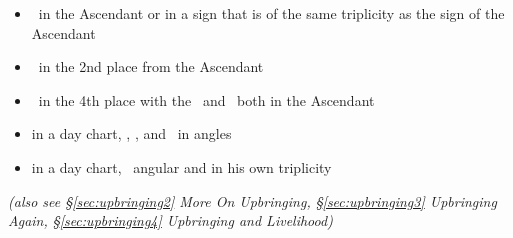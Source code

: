 \begin{itemize}[topsep=0pt,itemsep=0pt]
\item \Jupiter\, in the Ascendant or in a sign that is of the same triplicity as the sign of the Ascendant 

\item \Jupiter\, in the 2nd place from the Ascendant

\item \Jupiter\, in the 4th place with the \Moon\, and \Mercury\, both in the Ascendant

\item in a day chart, \Saturn, \Jupiter, and \Mercury\, in angles

\item in a day chart, \Saturn\, angular and in his own triplicity
\end{itemize}

\textsl{\small(also see \S\ref{sec:upbringing2} More On Upbringing, \S\ref{sec:upbringing3} Upbringing Again, \S\ref{sec:upbringing4} Upbringing and Livelihood)}




